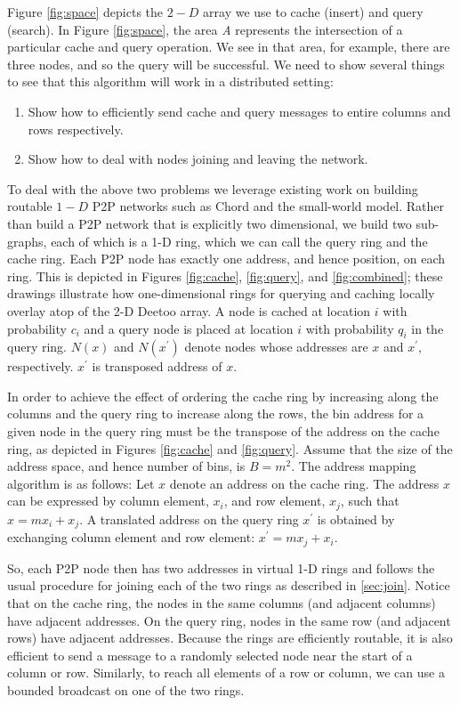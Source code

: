 \documentclass[conference]{IEEEtran}
\begin{document}
Figure \ref{fig:space} depicts the $2-D$ array we use to cache (insert)
and query (search).  In Figure \ref{fig:space}, the area \textit{A} represents the
intersection of a particular cache and query operation.  We see in that
area, for example, there are three nodes, and so the query will be successful.  We need to
show several things to see that this algorithm will work in a distributed
setting:
\begin{enumerate}
\item Show how to efficiently send cache and query messages to entire columns
and rows respectively.
\item Show how to deal with nodes joining and leaving the network.
\end{enumerate}

To deal with the above two problems we leverage existing work on building
routable $1-D$ P2P networks such as Chord\cite{is:Chord} and the small-world
model\cite{jk:Algorithmic}.  Rather than build a P2P network that is
explicitly two dimensional, we build two sub-graphs, each of which is a 1-D 
ring, which we can call the query ring and the cache ring.  Each P2P 
node has exactly one address, and hence position, on each ring.  This is
depicted in Figures \ref{fig:cache}, \ref{fig:query}, and \ref{fig:combined}; 
these drawings illustrate how one-dimensional rings for querying and caching 
locally overlay atop of the 2-D Deetoo array.
A node is cached at location $i$ with probability $c_{i}$ and a
query node is placed at location $i$ with probability $q_{i}$ in the query ring. 
$N(x)$ and $N(x^\prime)$ denote nodes whose addresses are $x$ and $x^\prime$, respectively.
$x^\prime$ is transposed address of $x$.

In order to achieve the effect of ordering the cache ring by increasing
along the columns and the query ring to increase along the rows, the bin
address for a given node in the query ring must be the transpose of the
address on the cache ring, as depicted in Figures \ref{fig:cache} and \ref{fig:query}.  
Assume that the size of the address space,
and hence number of bins, is $B=m^2$.
The address mapping algorithm is as
follows: Let $x$ denote an address on the cache ring. The address
$x$ can be expressed by
column element, $x_{i}$, and row element, $x_{j}$, such
that $x = m x_i + x_j$.
A translated address on the query ring $x^\prime$ is obtained by exchanging
column element and row element:
$x^\prime = m x_{j} +x_{i}$.

So, each P2P node then has two addresses in virtual 1-D rings and follows the usual
procedure for joining each of the two rings as described in \ref{sec:join}.
Notice that on the cache ring, the nodes in the same columns (and adjacent
columns) have adjacent addresses.  On the query ring, nodes in the same row
(and adjacent rows) have adjacent addresses.  Because the rings are efficiently
routable, it is also efficient to send a message to a randomly selected node near
the start of a column or row.  Similarly, to reach all elements of a row or
column, we can use a bounded broadcast on one of the two rings.  
\end{document}
